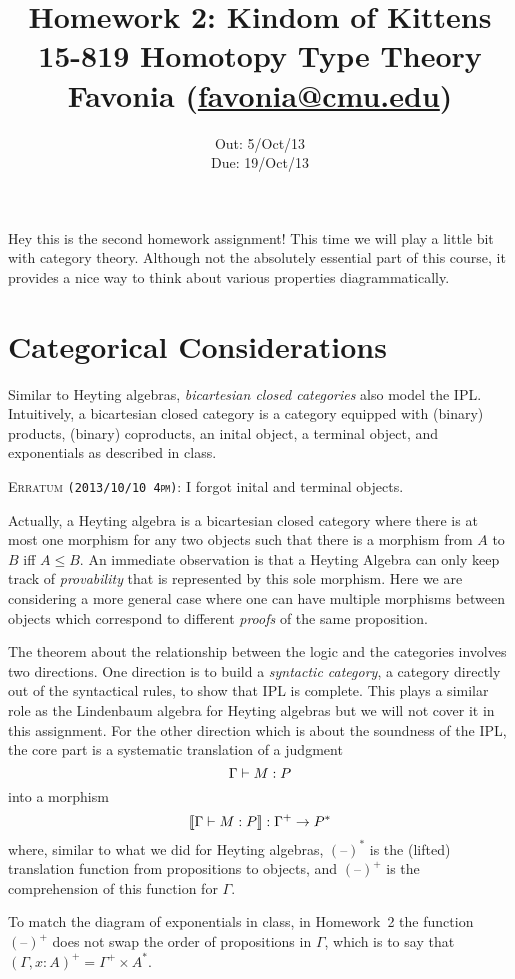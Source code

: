 \documentclass[12pt]{article}
\title{\Large\textbf{
  Homework 2: Kindom of Kittens}
\normalsize\\
15-819 Homotopy Type Theory\\
Favonia (\href{mailto:favonia@cmu.edu}{favonia@cmu.edu})}
\author{}
\date{%
Out: 5/Oct/13\\
Due: 19/Oct/13
}
\newcommand{\showextra}[1]{\color{DarkOliveGreen}#1\normalcolor}
\begin{document}
\maketitle

Hey this is the second homework assignment!
This time we will play a little bit with category theory.
Although not the absolutely essential part of this course,
it provides a nice way to think about various properties diagrammatically.

\section{Categorical Considerations}

Similar to Heyting algebras, \emph{bicartesian closed categories} also model the IPL.
Intuitively, a bicartesian closed category is a category
equipped with (binary) products,
(binary) coproducts,
\showextra{an inital object, a terminal object,}
and exponentials as described in class.
\showextra{
  \begin{mdframed}[style=extra]
    \textsc{Erratum \texttt{(2013/10/10 4pm)}:}
    I forgot inital and terminal objects.
  \end{mdframed}
}
Actually, a Heyting algebra is a bicartesian closed category
where there is at most one morphism for any two objects
such that there is a morphism from $A$ to $B$ iff $A \leq B$.
An immediate observation is that
a Heyting Algebra can only keep track of \emph{provability}
that is represented by this sole morphism.
Here we are considering a more general case where
one can have multiple morphisms between objects
which correspond to different \emph{proofs} of the same proposition.

The theorem about the relationship
between the logic and the categories
involves two directions.
One direction is to build a \emph{syntactic category},
a category directly out of the syntactical rules,
to show that IPL is complete.
This plays a similar role as the Lindenbaum algebra for Heyting algebras
but we will not cover it in this assignment.
For the other direction which is about the soundness of the IPL,
the core part is a systematic translation of a judgment
$$\Gamma \vdash M : P$$
into a morphism
$$\llbracket \Gamma \vdash M : P\rrbracket : \Gamma^+ \to P^*$$
where,
similar to what we did for Heyting algebras,
$(\text{--})^*$ is the (lifted) translation function from propositions to objects,
and $(\text{--})^+$ is the comprehension of this function for $\Gamma$.

\begin{remark}
  To match the diagram of exponentials in class,
  in Homework~2 the function $(\text{--})^+$
  does not swap the order of propositions in $\Gamma$,
  which is to say that $(\Gamma, x{:}A)^+ = \Gamma^+ \times A^*$.
\end{remark}
\end{document}
